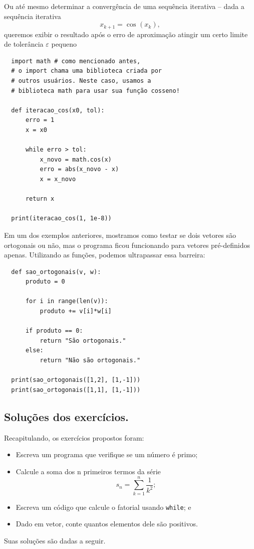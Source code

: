 \documentclass[../numerical_methods.tex]{subfiles}
\begin{document}
Ou até mesmo determinar a convergência de uma sequência iterativa -- dada a sequência iterativa
\[
	x_{k+1} = \cos^{}{(x_{k})},
\]
queremos exibir o resultado após o erro de aproximação atingir um certo limite de tolerância \(\varepsilon \) pequeno
\begin{listing}[H]
	\caption{Convergência de uma sequência iterativa}
	\begin{verbatim}
  import math # como mencionado antes, 
  # o import chama uma biblioteca criada por 
  # outros usuários. Neste caso, usamos a 
  # biblioteca math para usar sua função cosseno!

  def iteracao_cos(x0, tol):
      erro = 1 
      x = x0

      while erro > tol: 
          x_novo = math.cos(x) 
          erro = abs(x_novo - x)
          x = x_novo 

      return x

  print(iteracao_cos(1, 1e-8))
  \end{verbatim}
\end{listing}

Em um dos exemplos anteriores, mostramos como testar se dois vetores são ortogonais ou não, mas o programa ficou funcionando para vetores pré-definidos apenas.
Utilizando as funções, podemos ultrapassar essa barreira:
\begin{listing}[H]
	\caption{Testagem de ortogonalidade de vetores.}
	\begin{verbatim}
  def sao_ortogonais(v, w): 
      produto = 0 

      for i in range(len(v)):
          produto += v[i]*w[i]

      if produto == 0:
          return "São ortogonais."
      else: 
          return "Não são ortogonais."

  print(sao_ortogonais([1,2], [1,-1]))
  print(sao_ortogonais([1,1], [1,-1]))
  \end{verbatim}
\end{listing}

\subsection{Soluções dos exercícios.}
Recapitulando, os exercícios propostos foram:
\begin{itemize}
	\item[1)] Escreva um programa que verifique se um número é primo;
	\item[2)] Calcule a soma dos n primeiros termos da série
	      \[
		      s_{n} = \sum\limits_{k=1}^{n}\frac{1}{k^{2}};
	      \]
	\item[3)] Escreva um código que calcule o fatorial usando \texttt{while}; e
	\item[4)] Dado em vetor, conte quantos elementos dele são positivos.

\end{itemize}
Suas soluções são dadas a seguir.
\end{document}
